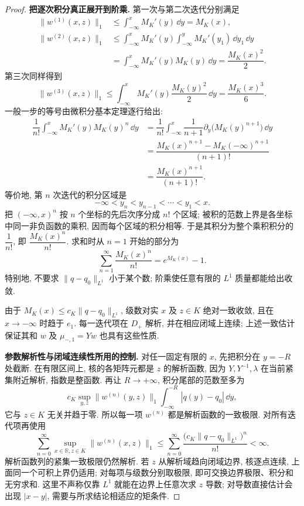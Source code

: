 \begin{proof}
\par\medskip\noindent\textbf{把逐次积分真正展开到阶乘.}\quad 
第一次与第二次迭代分别满足
\begin{align*}
\|w^{(1)}(x,z)\|_1
&\le\int_{-\infty}^{x}M_{ K}'(y)\,\dd y
=M_{ K}(x),\\
\|w^{(2)}(x,z)\|_1
&\le\int_{-\infty}^{x}M_{ K}'(y)
\int_{-\infty}^{y}M_{ K}'(y_1)\,\dd y_1\,\dd y\\
&=\int_{-\infty}^{x}M_{ K}'(y)M_{ K}(y)\,\dd y
=\dfrac{M_{ K}(x)^2}{2}.
\end{align*}
第三次同样得到
\[
\|w^{(3)}(x,z)\|_1
\le\int_{-\infty}^{x}M_{ K}'(y)
\dfrac{M_{ K}(y)^2}{2}\,\dd y
=\dfrac{M_{ K}(x)^3}{6}.
\]
一般一步的等号由微积分基本定理逐行给出:
\begin{align*}
\dfrac{1}{n!}\int_{-\infty}^{x}
M_{ K}'(y)M_{ K}(y)^n\,\dd y
&=\dfrac{1}{n!}\int_{-\infty}^{x}
\dfrac{1}{n+1}\partial_y\bigl(M_{ K}(y)^{n+1}\bigr)\,\dd y\\
&=\dfrac{M_{ K}(x)^{n+1}-M_{ K}(-\infty)^{n+1}}{(n+1)!}\\
&=\dfrac{M_{ K}(x)^{n+1}}{(n+1)!}.
\end{align*}
等价地, 第 $n$ 次迭代的积分区域是
\[
-\infty<y_n<y_{n-1}<\cdots<y_1<x.
\]
把 $( -\infty,x)^n$ 按 $n$ 个坐标的先后次序分成 $n!$ 个区域;
被积的范数上界是各坐标中同一非负函数的乘积, 因而每个区域的积分相等.
于是其积分为整个乘积积分的 $\dfrac{1}{n!}$, 即
$\dfrac{M_{ K}(x)^n}{n!}$.
求和时从 $n=1$ 开始的部分为
\[
\sum\limits_{n=1}^{\infty}\dfrac{M_{ K}(x)^n}{n!}
=e^{M_{ K}(x)}-1.
\]
特别地, 不要求 $\|q-q_0\|_{L^1}$ 小于某个数;
阶乘使任意有限的 $L^1$ 质量都能给出收敛.

由于 $M_{K}(x)\le c_{K}\|q-q_0\|_{L^1}$, 级数对实 $x$ 及 $z\in K$ 绝对一致收敛, 且在 $x\to-\infty$ 时趋于 $e_1$. 每一迭代项在 $D_+$ 解析, 并在相应闭域上连续; 上述一致估计保证其和 $w$ 及 $\mu_{-,1}=Yw$ 也具有这些性质.


\par\medskip\noindent\textbf{参数解析性与闭域连续性所用的控制.}\quad 
对任一固定有限的 $x$, 先把积分在 $y=-R$ 处截断.
在有限区间上, 核的各矩阵元都是 $z$ 的解析函数,
因为 $Y,Y^{-1},\lambda$ 在当前紧集附近解析, 指数是整函数.
再让 $R\to+\infty$, 积分尾部的范数至多为
\[
c_{ K}\sup\limits_{y,z}\|w^{(n)}(y,z)\|_1
\int_{-\infty}^{-R}|q(y)-q_0|\,\dd y,
\]
它与 $z\in K$ 无关并趋于零.
所以每一项 $w^{(n)}$ 都是解析函数的一致极限.
对所有迭代项再使用
\[
\sum\limits_{n=0}^{\infty}
\sup\limits_{x\in\mathbb R,z\in K}\|w^{(n)}(x,z)\|_1
\le\sum\limits_{n=0}^{\infty}
\dfrac{\bigl(c_{ K}\|q-q_0\|_{L^1}\bigr)^n}{n!}<\infty.
\]
解析函数列的紧集一致极限仍然解析.
若 $z$ 从解析域趋向闭域边界, 核逐点连续,
上面同一个可积上界仍适用; 对每项与级数分别取极限,
即可交换边界极限、积分和无穷求和.
这里不声称仅靠 $L^1$ 就能在边界上任意次求 $z$ 导数;
对导数直接估计会出现 $|x-y|$, 需要与所求结论相适应的矩条件.


\end{proof}
